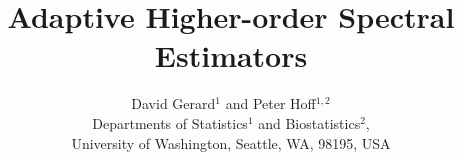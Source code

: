 \documentclass[11pt,authoryear]{article}
\begin{document}
\singlespacing
\title{Adaptive Higher-order Spectral Estimators}
\author{David Gerard$^1$ and Peter Hoff$^{1,2}$ \\
Departments of Statistics$^1$ and Biostatistics$^2$, \\
 University of Washington, Seattle, WA, 98195, USA}
\maketitle
\let\thefootnote\relax{}









\appendix



\end{document}
